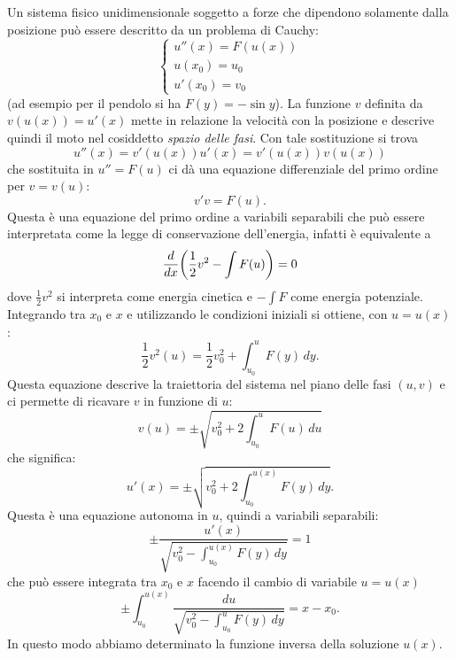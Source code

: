 \begin{example}
Un sistema fisico unidimensionale soggetto a forze che dipendono solamente
dalla posizione può essere descritto da un problema di Cauchy:
\[
\begin{cases}
  u''(x) = F(u(x)) \\
  u(x_0) = u_0 \\
  u'(x_0) = v_0
\end{cases}
\]
(ad esempio per il pendolo si ha $F(y) = -\sin y$).
La funzione $v$ definita da $v(u(x)) = u'(x)$ mette in relazione
la velocità con la posizione e descrive quindi il moto nel
cosiddetto \emph{spazio delle fasi}. Con tale sostituzione si
trova
\[
  u''(x) = v'(u(x)) u'(x) = v'(u(x)) v(u(x))
\]
che sostituita in $u'' = F(u)$ ci dà una equazione
differenziale del primo ordine per $v=v(u)$:
\[
 v' v  = F(u).
\]
Questa è una equazione del primo ordine a variabili separabili
che può essere interpretata come la legge di conservazione dell'energia,
infatti è equivalente a
\[
  \frac{d}{dx}{\left( \frac 1 2 v^2 - \int F(u) \right)} = 0
\]
dove $\frac 1 2 v^2$ si interpreta come energia cinetica e $-\int F$
come energia potenziale.
Integrando tra $x_0$ e $x$ e utilizzando le condizioni iniziali si ottiene,
con $u=u(x)$:
\[
  \frac 1 2 v^2(u) = \frac 1 2 v_0^2 + \int_{u_0}^{u} F(y)\, dy.
\]
Questa equazione descrive la traiettoria del sistema nel piano delle fasi $(u,v)$
e ci permette di ricavare $v$ in funzione di $u$:
\[
  v(u) = \pm\sqrt{v_0^2 + 2\int_{u_0}^u F(u)\, du}
\]
che significa:
\begin{equation}\label{eq:8844475}
  u'(x) = \pm \sqrt{v_0^2 + 2 \int_{u_0}^{u(x)} F(y)\, dy}.
\end{equation}
Questa è una equazione autonoma in $u$, quindi a variabili separabili:
\[
  \pm\frac{u'(x)}{\sqrt{v_0^2 - \int_{u_0}^{u(x)} F(y)\, dy}} = 1
\]
che può essere integrata tra $x_0$ e $x$ facendo il cambio di variabile $u=u(x)$
\[
  \pm\int_{u_0}^{u(x)} \frac{du}{\sqrt{v_0^2-\int_{u_0}^u F(y)\, dy}} = x-x_0.
\]
In questo modo abbiamo determinato la funzione inversa della soluzione $u(x)$.
\end{example}

